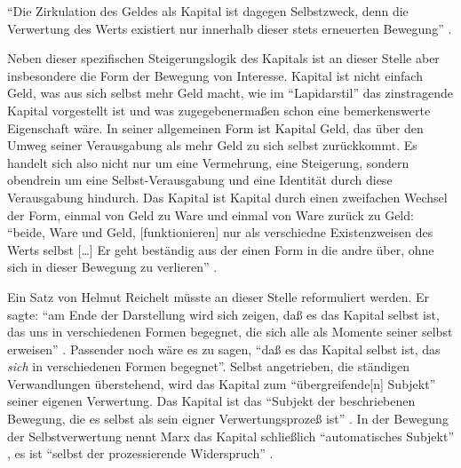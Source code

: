 \documentclass[12pt,
               DIV13,
               paper=a4,
               twoside=false,
               onehalfspacing,
               bibliography=totoc,
               toc=graduated,
               draft,
               ]{scrartcl}
\newcommand{\lips}{\dots\unkern}
\newcommand{\pc}[2]{\parencite[#1]{#2}}
\newcommand{\zn}[3]{\parencite[#1, zit. nach][#2]{#3}}
\begin{document}
"`Die Zirkulation des Geldes als Kapital ist dagegen Selbstzweck, denn
die Verwertung des Werts existiert nur innerhalb dieser stets
erneuerten Bewegung"' \pc{167}{kap}.




Neben dieser spezifischen Steigerungslogik des Kapitals ist an dieser
Stelle aber insbesondere die Form der Bewegung von Interesse. Kapital
ist nicht einfach Geld, was aus sich selbst mehr Geld macht, wie im
"`Lapidarstil"' \pc{170}{kap} das zinstragende Kapital vorgestellt ist
und was zugegebenermaßen schon eine bemerkenswerte Eigenschaft wäre.
In seiner allgemeinen Form ist Kapital Geld, das über den Umweg seiner
Verausgabung als mehr Geld zu sich selbst zurückkommt. Es handelt sich
also nicht nur um eine Vermehrung, eine Steigerung, sondern obendrein
um eine Selbst-Verausgabung und eine Identität durch diese
Verausgabung hindurch. Das Kapital ist Kapital durch einen zweifachen
Wechsel der Form, einmal von Geld zu Ware und einmal von Ware zurück
zu Geld: "`beide, Ware und Geld, [funktionieren] nur als verschiedne
Existenzweisen des Werts selbst [\lips] Er geht beständig aus der
einen Form in die andre über, ohne sich in dieser Bewegung zu
verlieren"' \pc{S. 168 f.}{kap}.


Ein Satz von Helmut Reichelt müsste an dieser Stelle reformuliert
werden. Er sagte: "`am Ende der Darstellung wird sich zeigen, daß es
das Kapital selbst ist, das uns in verschiedenen Formen begegnet, die
sich alle als Momente seiner selbst erweisen"' \pc{181}{reichelt}.
Passender noch wäre es zu sagen, "`daß es das Kapital selbst ist, das
\emph{sich} in verschiedenen Formen begegnet"'. Selbst angetrieben,
die ständigen Verwandlungen überstehend, wird das Kapital zum
"`übergreifende[n] Subjekt"' \pc{169}{kap} seiner eigenen Verwertung.
Das Kapital ist das "`Subjekt der beschriebenen Bewegung, die es
selbst als sein eigner Verwertungsprozeß ist"'
\zn{Marx}{181}{reichelt}. In der Bewegung der Selbstverwertung nennt
Marx das Kapital schließlich "`automatisches Subjekt"' \pc{169}{kap},
es ist "`selbst der prozessierende Widerspruch"' \pc{601}{grundr}.
\end{document}
